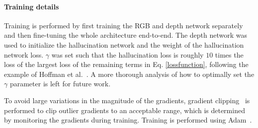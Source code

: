 \documentclass[journal]{IEEEtran}
\begin{document}
\paragraph*{Training details}
Training is performed by first training the RGB and depth network separately and then fine-tuning the whole architecture end-to-end. The depth network was used to initialize the hallucination network and the weight of the hallucination network loss. $\gamma$ was set such that the hallucination loss is roughly $10$ times the loss of the largest loss of the remaining terms in Eq. \ref{lossfunction}, following the example of Hoffman et al.~\cite{Hoffman_2016_CVPR}. A more thorough analysis of how to optimally set the $\gamma$ parameter is left for future work.

To avoid large variations in the magnitude of the gradients, gradient clipping~\cite{pascanu2012understanding} is performed to clip outlier gradients to an acceptable range, which is determined by monitoring the gradients during training. Training is performed using Adam~\cite{kingma2014adam}.
\end{document}
